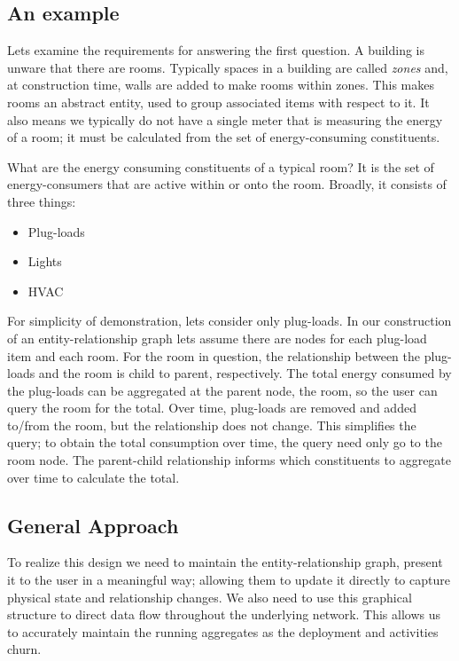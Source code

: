 \subsection{An example}
Lets examine the requirements for answering the first question.
A building is unware that there are rooms. Typically spaces in a building are called \emph{zones} and, 
at construction time, walls are added to make rooms within zones.  This makes rooms an abstract
entity, used to group associated items with respect to it.  It also means
we typically do not have a single meter that is measuring the energy of a room; it
must be calculated from the set of energy-consuming constituents.

What are the energy consuming constituents of a typical room?  It is the set of energy-consumers that
are active within or onto the room.  Broadly, it consists of three things:

\begin{itemize}
\item Plug-loads
\item Lights
\item HVAC
\end{itemize}
\vspace{0.08in}

For simplicity of demonstration, lets consider only plug-loads.  In our construction of an entity-relationship
graph lets assume there are nodes for each plug-load item and each room.  For the room in question, the relationship
between the plug-loads and the room is child to parent, respectively.  The total energy consumed by
the plug-loads can be aggregated at the parent node, the room, so the user can query the room for
the total.  Over time, plug-loads are removed and added to/from the room, but the relationship does not
change.  This simplifies the query; to obtain the total consumption over time, the query need only
go to the room node.  The parent-child relationship informs which constituents to aggregate over time
to calculate the total.

\subsection{General Approach}
To realize this design we need to maintain the entity-relationship graph, present it to the user in a meaningful
way; allowing them to update it directly to capture physical state and relationship changes.  We also need to
use this graphical structure to direct data flow throughout the underlying network.  This allows us
to accurately maintain the running aggregates as the deployment and activities churn.

